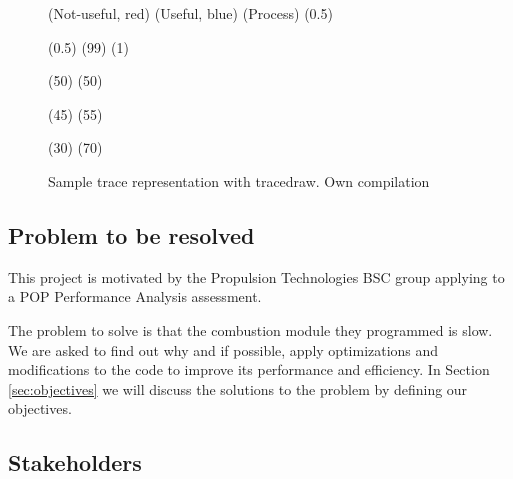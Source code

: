\begin{itemize}
    \begin{figure}[htbp]
      \centering
      \begin{tracedraw}{0.8}
        \tracedrawAddToLegend(\large{Not-useful}, red)
        \tracedrawAddToLegend(\large{Useful}, blue)
        \tracedrawEnableLineName(\large{Process})
        \tracedrawSetLegendColorScale(0.5)

        \tracedrawSetLineHeight(0.5)
        \tracedrawAddChunk[color=gray, fill=blue](99)
        \tracedrawAddChunk[color=gray, fill=red](1)

        \tracedrawNewLine

        \tracedrawAddChunk[color=gray, fill=blue](50)
        \tracedrawAddChunk[color=gray, fill=red](50)

        \tracedrawNewLine
        
        \tracedrawAddChunk[color=gray, fill=blue](45)
        \tracedrawAddChunk[color=gray, fill=red](55)

        \tracedrawNewLine
        
        \tracedrawAddChunk[color=gray, fill=blue](30)
        \tracedrawAddChunk[color=gray, fill=red](70)

      \end{tracedraw}
      \caption[Sample trace representation with tracedraw]{Sample trace representation with tracedraw. Own compilation}
      \label{fig:tracedraw}
    \end{figure}

\end{itemize}

\subsection{Problem to be resolved}
\justify
This project is motivated by the Propulsion Technologies BSC group applying to a POP Performance Analysis assessment.

\justify
The problem to solve is that the combustion module they programmed is slow. We are asked to find out why and if possible, apply optimizations and modifications to the code to improve its performance and efficiency. In Section \ref{sec:objectives} we will discuss the solutions to the problem by defining our objectives.


\subsection{Stakeholders}

